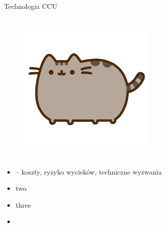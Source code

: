 \begin{columnframe}{Technologia CCU}
    \begin{column}{0.5\textwidth}
        \begin{figure}
            \centering
            \includegraphics[width=0.6\textwidth, frame]{images/pusheen.png}
        \end{figure}
    \end{column}
    \begin{column}{0.5\textwidth}
        \begin{itemize}
            \item  – koszty, ryzyko wycieków, techniczne wyzwania
            \item two \MeV
            \item three \GeV
            \item \aegis
        \end{itemize}
    \end{column}
\end{columnframe}
